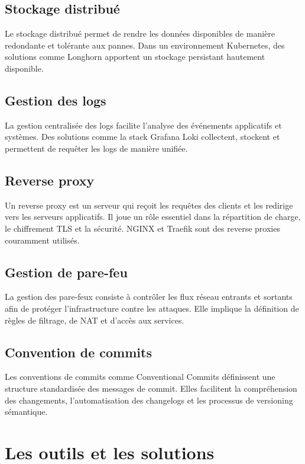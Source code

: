\subsection{Stockage distribué}

Le stockage distribué permet de rendre les données disponibles de manière redondante et tolérante aux pannes. Dans un environnement Kubernetes, des solutions comme Longhorn apportent un stockage persistant hautement disponible.

\subsection{Gestion des logs}

La gestion centralisée des logs facilite l’analyse des événements applicatifs et systèmes. Des solutions comme la stack Grafana Loki collectent, stockent et permettent de requêter les logs de manière unifiée.

\subsection{Reverse proxy}

Un reverse proxy est un serveur qui reçoit les requêtes des clients et les redirige vers les serveurs applicatifs. Il joue un rôle essentiel dans la répartition de charge, le chiffrement TLS et la sécurité. NGINX et Traefik sont des reverse proxies couramment utilisés.

\subsection{Gestion de pare-feu}

La gestion des pare-feux consiste à contrôler les flux réseau entrants et sortants afin de protéger l’infrastructure contre les attaques. Elle implique la définition de règles de filtrage, de NAT et d’accès aux services.

\subsection{Convention de commits}

Les conventions de commits comme Conventional Commits définissent une structure standardisée des messages de commit. Elles facilitent la compréhension des changements, l’automatisation des changelogs et les processus de versioning sémantique.

\section{Les outils et les solutions}

